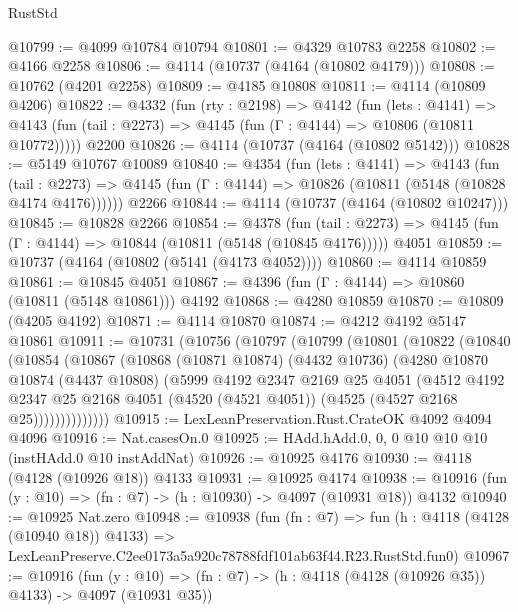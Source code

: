 \begin{lexlean}{RustStd}
\begin{coremodule}
@10799 := @4099 @10784 @10794
@10801 := @4329 @10783 @2258
@10802 := @4166 @2258
@10806 := @4114 (@10737 (@4164 (@10802 @4179)))
@10808 := @10762 (@4201 @2258)
@10809 := @4185 @10808
@10811 := @4114 (@10809 @4206)
@10822 := @4332
    (fun (rty : @2198) =>
    @4142
      (fun (lets : @4141) =>
      @4143 (fun (tail : @2273) => @4145 (fun (Γ : @4144) => @10806 (@10811 @10772)))))
    @2200
@10826 := @4114 (@10737 (@4164 (@10802 @5142)))
@10828 := @5149 @10767 @10089
@10840 := @4354
    (fun (lets : @4141) =>
    @4143
      (fun (tail : @2273) =>
      @4145 (fun (Γ : @4144) => @10826 (@10811 (@5148 (@10828 @4174 @4176))))))
    @2266
@10844 := @4114 (@10737 (@4164 (@10802 @10247)))
@10845 := @10828 @2266
@10854 := @4378
    (fun (tail : @2273) => @4145 (fun (Γ : @4144) => @10844 (@10811 (@5148 (@10845 @4176)))))
    @4051
@10859 := @10737 (@4164 (@10802 (@5141 (@4173 @4052))))
@10860 := @4114 @10859
@10861 := @10845 @4051
@10867 := @4396 (fun (Γ : @4144) => @10860 (@10811 (@5148 @10861))) @4192
@10868 := @4280 @10859
@10870 := @10809 (@4205 @4192)
@10871 := @4114 @10870
@10874 := @4212 @4192 @5147 @10861
@10911 := @10731
    (@10756
      (@10797
        (@10799
          (@10801
            (@10822
              (@10840
                (@10854
                  (@10867
                    (@10868
                      (@10871 @10874)
                      (@4432 @10736)
                      (@4280
                        @10870
                        @10874
                        (@4437 @10808)
                        (@5999
                          @4192
                          @2347
                          @2169
                          @25
                          @4051
                          (@4512
                            @4192
                            @2347
                            @25
                            @2168
                            @4051
                            (@4520 (@4521 @4051))
                            (@4525 (@4527 @2168 @25))))))))))))))
@10915 := LexLeanPreservation.Rust.CrateOK @4092 @4094 @4096
@10916 := Nat.casesOn.{0}
@10925 := HAdd.hAdd.{0, 0, 0} @10 @10 @10 (instHAdd.{0} @10 instAddNat)
@10926 := @10925 @4176
@10930 := @4118 (@4128 (@10926 @18)) @4133
@10931 := @10925 @4174
@10938 := @10916 (fun (y : @10) => (fn : @7) -> (h : @10930) -> @4097 (@10931 @18)) @4132
@10940 := @10925 Nat.zero
@10948 := @10938
    (fun (fn : @7) =>
    fun (h : @4118 (@4128 (@10940 @18)) @4133) =>
    LexLeanPreserve.C2ee0173a5a920c78788fdf101ab63f44.R23.RustStd.fun0)
@10967 := @10916
    (fun (y : @10) => (fn : @7) -> (h : @4118 (@4128 (@10926 @35)) @4133) -> @4097 (@10931 @35))

\end{coremodule}
\end{lexlean}
